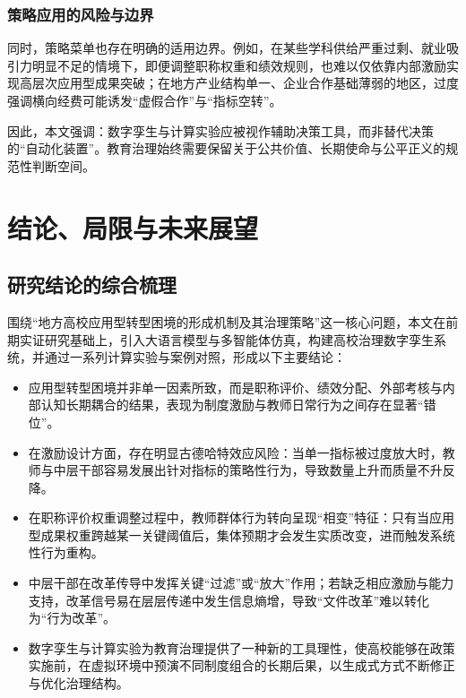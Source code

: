 \documentclass[UTF8, zihao=-4, fontset=mac]{ctexart}
\begin{document}
\subsubsection{策略应用的风险与边界}

同时，策略菜单也存在明确的适用边界。例如，在某些学科供给严重过剩、就业吸引力明显不足的情境下，即便调整职称权重和绩效规则，也难以仅依靠内部激励实现高层次应用型成果突破；在地方产业结构单一、企业合作基础薄弱的地区，过度强调横向经费可能诱发“虚假合作”与“指标空转”。

因此，本文强调：数字孪生与计算实验应被视作辅助决策工具，而非替代决策的“自动化装置”。教育治理始终需要保留关于公共价值、长期使命与公平正义的规范性判断空间。

\section{结论、局限与未来展望}

\subsection{研究结论的综合梳理}

围绕“地方高校应用型转型困境的形成机制及其治理策略”这一核心问题，本文在前期实证研究基础上，引入大语言模型与多智能体仿真，构建高校治理数字孪生系统，并通过一系列计算实验与案例对照，形成以下主要结论：

\begin{itemize}
    \item 应用型转型困境并非单一因素所致，而是职称评价、绩效分配、外部考核与内部认知长期耦合的结果，表现为制度激励与教师日常行为之间存在显著“错位”。
    \item 在激励设计方面，存在明显古德哈特效应风险：当单一指标被过度放大时，教师与中层干部容易发展出针对指标的策略性行为，导致数量上升而质量不升反降。
    \item 在职称评价权重调整过程中，教师群体行为转向呈现“相变”特征：只有当应用型成果权重跨越某一关键阈值后，集体预期才会发生实质改变，进而触发系统性行为重构。
    \item 中层干部在改革传导中发挥关键“过滤”或“放大”作用；若缺乏相应激励与能力支持，改革信号易在层层传递中发生信息熵增，导致“文件改革”难以转化为“行为改革”。
    \item 数字孪生与计算实验为教育治理提供了一种新的工具理性，使高校能够在政策实施前，在虚拟环境中预演不同制度组合的长期后果，以生成式方式不断修正与优化治理结构。
\end{itemize}
\end{document}
